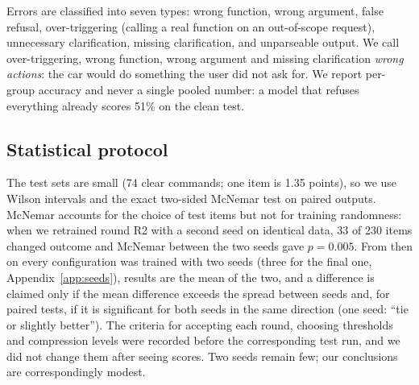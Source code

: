 Errors are classified into seven types: wrong function, wrong argument, false refusal, over-triggering (calling a real
function on an out-of-scope request), unnecessary clarification, missing clarification, and unparseable output. We call
over-triggering, wrong function, wrong argument and missing clarification \emph{wrong actions}: the car would do something the
user did not ask for. We report per-group accuracy and never a single pooled number: a model that refuses everything already
scores 51\% on the clean test.

\subsection{Statistical protocol}
\label{sec:stats}

The test sets are small (74 clear commands; one item is 1.35 points), so we use Wilson intervals \citep{wilson1927} and the
exact two-sided McNemar test \citep{mcnemar1947} on paired outputs. McNemar accounts for the choice of test items but not for
training randomness: when we retrained round R2 with a second seed on identical data, 33 of 230 items changed outcome and
McNemar between the two seeds gave $p=0.005$. From then on every configuration was trained with two seeds (three for the final one, Appendix~\ref{app:seeds}), results are the
mean of the two, and a difference is claimed only if the mean difference exceeds the spread between seeds and, for paired
tests, if it is significant for both seeds in the same direction (one seed: ``tie or slightly better''). The criteria for
accepting each round, choosing thresholds and compression levels were recorded before the corresponding test run, and we
did not change them after seeing scores. Two seeds remain few; our conclusions are correspondingly modest.
